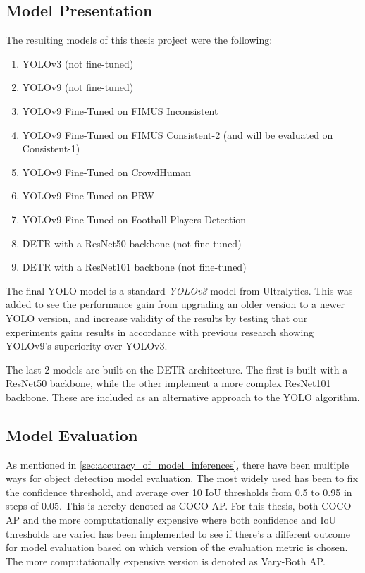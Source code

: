 \subsection{Model Presentation}
\label{sec:model_presentation}
The resulting models of this thesis project were the following: 
\begin{enumerate}
    \item YOLOv3 (not fine-tuned)
    \item YOLOv9 (not fine-tuned)
    \item YOLOv9 Fine-Tuned on FIMUS Inconsistent
    \item YOLOv9 Fine-Tuned on FIMUS Consistent-2 (and will be evaluated on Consistent-1)
    \item YOLOv9 Fine-Tuned on CrowdHuman 
    \item YOLOv9 Fine-Tuned on PRW
    \item YOLOv9 Fine-Tuned on Football Players Detection
    \item DETR with a ResNet50 backbone (not fine-tuned)
    \item DETR with a ResNet101 backbone (not fine-tuned)
\end{enumerate}

The final YOLO model is a standard \textit{YOLOv3} model from Ultralytics. This was added to see the performance gain from upgrading an older version to a newer YOLO version, and increase validity of the results by testing that our experiments gains results in accordance with previous research showing YOLOv9's superiority over YOLOv3.

The last 2 models are built on the DETR architecture. The first is built with a ResNet50 backbone, while the other implement a more complex ResNet101 backbone. These are included as an alternative approach to the YOLO algorithm.

\subsection{Model Evaluation}
\label{sec:methodology_model_evaluation}
As mentioned in \ref{sec:accuracy_of_model_inferences}, there have been multiple ways for object detection model evaluation. The most widely used has been to fix the confidence threshold, and average over 10 IoU thresholds from 0.5 to 0.95 in steps of 0.05. This is hereby denoted as COCO AP. For this thesis, both COCO AP and the more computationally expensive where both confidence and IoU thresholds are varied has been implemented to see if there's a different outcome for model evaluation based on which version of the evaluation metric is chosen. The more computationally expensive version is denoted as Vary-Both AP.

